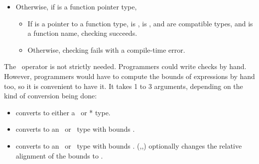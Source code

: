 \begin{itemize}
\item Otherwise, if  is a function pointer type,
\begin{itemize}
\item If  is a pointer to a function type,  is \ptrT,
 is ,  and  are compatible types, 
and  is a function name, checking succeeds.
\item Otherwise, checking fails with a compile-time error.
\end{itemize}
\end{itemize}

The \dynamicboundscast\ operator is not strictly needed.
Programmers could write checks by hand.  However, programmers
would have to compute the bounds of expressions by hand too, so it is convenient to
have it. It takes 1 to 3 arguments, depending on the kind of conversion being done:
\begin{itemize}
\item
  converts  to either a \ptr\ or * type.
\item
   converts  to an \arrayptr\ or
  \spanptr\ type with bounds .  
\item
   converts  to an
  \arrayptr\ or \spanptr\ type with bounds
  .  
  {(,,)}
   optionally changes the relative alignment of the bounds to .
\end{itemize}

